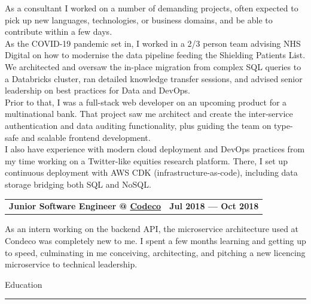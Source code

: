 \documentclass[hidelinks, 12pt, a4paper]{article}
\begin{document}
	\hspace{0.05\linewidth}\begin{minipage}{0.95\linewidth}
		As a consultant I worked on a number of demanding projects, often expected to pick up new languages, technologies, or business domains, and be able to contribute within a few days.\\
		
		As the COVID-19 pandemic set in, I worked in a 2/3 person team advising NHS Digital on how to modernise the data pipeline feeding the Shielding Patients List.
		We architected and oversaw the in-place migration from complex SQL queries to a Databricks cluster, ran detailed knowledge transfer sessions, and advised senior leadership on best practices for Data and DevOps.\\
		
		Prior to that, I was a full-stack web developer on an upcoming product for a multinational bank.
		That project saw me architect and create the inter-service authentication and data auditing functionality, plus guiding the team on type-safe and scalable frontend development.\\
		
		I also have experience with modern cloud deployment and DevOps practices from my time working on a Twitter-like equities research platform.
		There, I set up continuous deployment with AWS CDK (infrastructure-as-code), including data storage bridging both SQL and NoSQL.\\
	\end{minipage}


	\begin{tabularx}{\linewidth}{X r}
		\textbf{Junior Software Engineer @ \href{https://www.condecoconnect.com/}{Codeco}} & \textbf{Jul 2018 --- Oct 2018}
	\end{tabularx}\vspace{2pt}

	\hspace{0.05\linewidth}\begin{minipage}{0.95\linewidth}
		As an intern working on the backend API, the microservice architecture used at Condeco was completely new to me.
		I spent a few months learning and getting up to speed, culminating in me conceiving, architecting, and pitching a new licencing microservice to technical leadership.
	\end{minipage}
	
	\begin{Large}Education\end{Large}
	\rule{200pt}{1pt}\\
	
\end{document}
